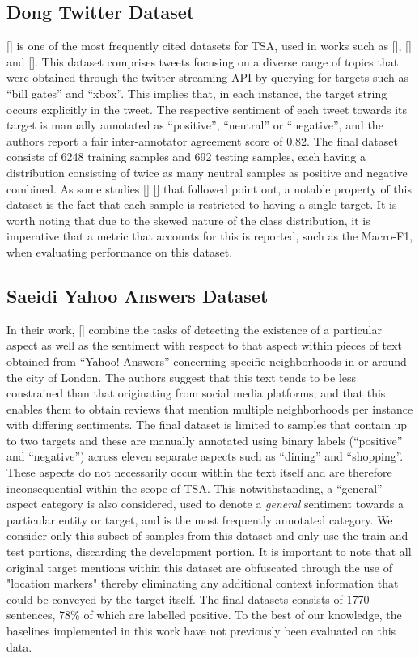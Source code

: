 \documentclass[12pt, a4paper]{report}
\theoremstyle{definition}
\theoremstyle{definition}%
\theoremstyle{definition}%
\theoremstyle{definition}%
\theoremstyle{definition}%
\theoremstyle{definition}%
\renewcommand{\cite}[1]{[\citealp{#1}]}
\begin{document}
\subsection{Dong Twitter Dataset}
\cite{dong} is one of the most frequently cited datasets for TSA, used in works such as \cite{tang2016b}, \cite{chen2017} and \cite{zheng2018}. This dataset comprises tweets focusing on a diverse range of topics that were obtained through the twitter streaming API by querying for targets such as \enquote{bill gates} and \enquote{xbox}. This implies that, in each instance, the target string occurs explicitly in the tweet. The respective sentiment of each tweet towards its target is manually annotated as \enquote{positive}, \enquote{neutral} or \enquote{negative}, and the authors report a fair inter-annotator agreement score of $0.82$.  The final dataset consists of 6248 training samples and 692 testing samples, each having a distribution consisting of twice as many neutral samples as positive and negative combined. As some studies \cite{wang2017} \cite{saeidi2016} that followed point out, a notable property of this dataset is the fact that each sample is restricted to having a single target. It is worth noting that due to the skewed nature of the class distribution, it is imperative that a metric that accounts for this is reported, such as the Macro-F1, when evaluating performance on this dataset.

\subsection{Saeidi Yahoo Answers Dataset}
In their work, \cite{saeidi2016} combine the tasks of detecting the existence of a particular aspect as well as the sentiment with respect to that aspect within pieces of text obtained from \enquote{Yahoo! Answers} concerning specific neighborhoods in or around the city of London. The authors suggest that this text tends to be less constrained than that originating from social media platforms, and that this enables them to obtain reviews that mention multiple neighborhoods per instance with differing sentiments. The final dataset is limited to samples that contain up to two targets and these are manually annotated using binary labels (\enquote{positive} and \enquote{negative}) across eleven separate aspects such as \enquote{dining} and \enquote{shopping}. These aspects do not necessarily occur within the text itself and are therefore inconsequential within the scope of TSA. This notwithstanding, a \enquote{general} aspect category is also considered, used to denote a \textit{general} sentiment towards a particular entity or target, and is the most frequently annotated category. We consider only this subset of samples from this dataset and only use the train and test portions, discarding the development portion. It is important to note that all original target mentions within this dataset are obfuscated through the use of "location markers" thereby eliminating any additional context information that could be conveyed by the target itself. The final datasets consists of 1770 sentences, 78\% of which are labelled positive. To the best of our knowledge, the baselines implemented in this work have not previously been evaluated on this data. 
\end{document}
